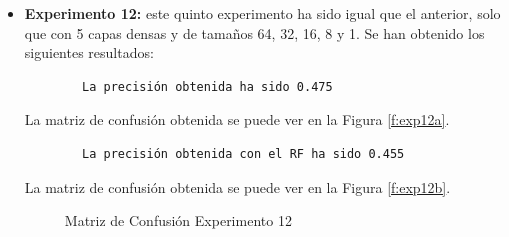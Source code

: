 \begin{itemize}
    \item \textbf{Experimento 12:} este quinto experimento ha sido igual que el anterior, solo que con 5 capas densas y de tamaños 64, 32, 16, 8 y 1. Se han obtenido los siguientes resultados:
    \begin{verbatim}
        La precisión obtenida ha sido 0.475
    \end{verbatim}
    La matriz de confusión obtenida se puede ver en la Figura \ref{f:exp12a}.
    \begin{verbatim}
        La precisión obtenida con el RF ha sido 0.455
    \end{verbatim}
    La matriz de confusión obtenida se puede ver en la Figura \ref{f:exp12b}.
    \begin{figure}[h]
     \centering
     \caption{Matriz de Confusión Experimento 12}
     \label{f:exp12}
    \end{figure}
    

\end{itemize}

